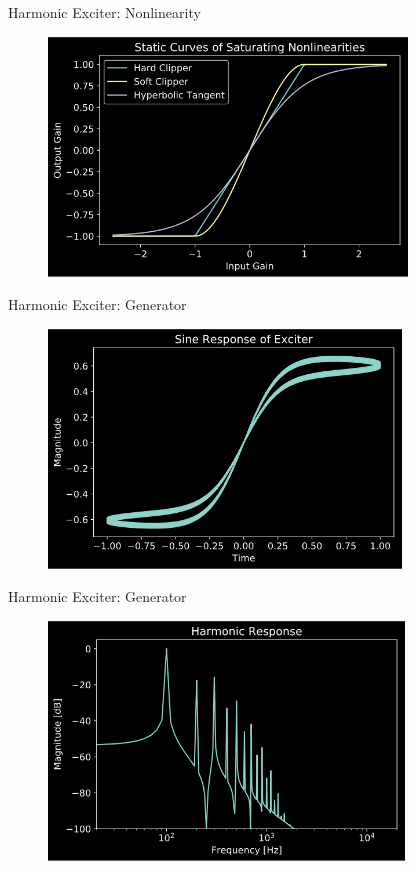 \begin{frame}{Harmonic Exciter: Nonlinearity}
    \begin{figure}
        \centering
        \includegraphics[height=2.5in]{../Exciter/Pics/saturating_static.png}
    \end{figure}
\end{frame}

\begin{frame}{Harmonic Exciter: Generator}
    \begin{figure}
        \centering
        \includegraphics[height=2.5in]{../Exciter/Pics/exciter_static.png}
    \end{figure}
\end{frame}

\begin{frame}{Harmonic Exciter: Generator}
    \begin{figure}
        \centering
        \includegraphics[height=2.5in]{../Exciter/Pics/exciter_harm.png}
    \end{figure}
\end{frame}
